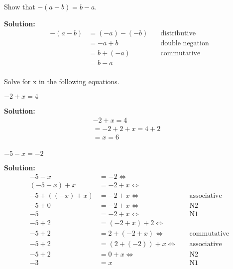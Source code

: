 \documentclass[6pt]{article}
\begin{document}
\begin{tcolorbox}[title=Problem 13, breakable]
Show that $-(a - b) = b - a$.
\end{tcolorbox}

\textbf{Solution:}
\begin{align*}
-(a - b) &= (-a) - (-b)  & \quad \text{distributive} \\
&= -a + b & \quad \text{double negation} \\
&= b + (-a) & \quad \text{commutative} \\
&= b - a & \quad \text{} \\
\end{align*}


Solve for x in the following equations.
\begin{tcolorbox}[title=Problem 14, breakable]
$-2 + x = 4$
\end{tcolorbox}

\textbf{Solution:}
\begin{align*}
-2 + x = 4  & \\
=-2 + 2 + x = 4 + 2 & \\
=x = 6 & \\
\end{align*}

\begin{tcolorbox}[title=Problem 19, breakable]
$-5 - x = -2$
\end{tcolorbox}

\textbf{Solution:}
\begin{align*}
-5 - x &= -2 \Leftrightarrow & \quad \text{} \\ 
(-5 - x) + x &= -2 + x \Leftrightarrow  & \quad \text{}  \\
-5 + ((-x) + x) &= -2 + x \Leftrightarrow  & \quad \text{associative}  \\
-5 + 0 &= -2 + x \Leftrightarrow  & \quad \text{N2}  \\
-5 &= -2 + x \Leftrightarrow & \quad \text{N1} \\
-5 + 2 &= (-2 + x) + 2 \Leftrightarrow  & \quad \text{}  \\ 
-5 + 2 &= 2 + (-2 + x) \Leftrightarrow  & \quad \text{commutative}  \\ 
-5 + 2 &= (2 + (-2)) + x \Leftrightarrow  & \quad \text{associative}  \\ 
-5 + 2 &= 0 + x \Leftrightarrow  & \quad \text{N2}  \\ 
-3 &= x  & \quad \text{N1}  \\
\end{align*}
\end{document}
